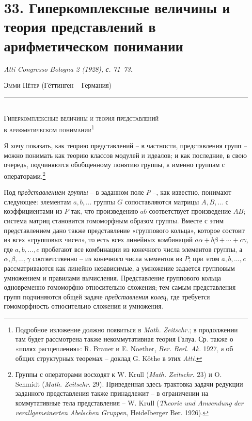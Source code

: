 \documentclass[11pt]{article}
\begin{document}
\section*{33. Гиперкомплексные величины и теория представлений в арифметическом понимании}
\emph{Atti Congresso Bologna 2 (1928), с. 71--73.}

\begin{center}
\textsc{Эмми Нётер} (Гёттинген -- Германия)\\[-0.1em]
\rule{3em}{0.4pt}\\[0.8em]
\textsc{Гиперкомплексные величины и теория представлений}\\
\textsc{в арифметическом понимании}\footnote{Подробное изложение должно появиться в \emph{Math. Zeitschr.}; в продолжении там будет рассмотрена также некоммутативная теория Галуа. Ср. также о «полях расщепления»: R. Brauer и E. Noether, \emph{Ber. Berl. Ak.} 1927, а об общих структурных теоремах -- доклад G. Köthe в этих \emph{Atti}.}
\end{center}

Я хочу показать, как теорию представлений -- в частности, представления групп -- можно понимать как теорию классов модулей и идеалов; и как последние, в свою очередь, подчиняются обобщенному понятию группы, а именно группам с операторами.\footnote{Группы с операторами восходят к W. Krull (\emph{Math. Zeitschr.} 23) и O. Schmidt (\emph{Math. Zeitschr.} 29). Приведенная здесь трактовка задачи редукции заданного представления также принадлежит -- в ограничении на коммутативные тела представления -- W. Krull (\emph{Theorie und Anwendung der verallgemeinerten Abelschen Gruppen}, Heidelberger Ber. 1926).}

Под \emph{представлением группы} -- в заданном поле $P$ --, как известно, понимают следующее: элементам $a,b,\ldots$ группы $G$ сопоставляются матрицы $A,B,\ldots$ с коэффициентами из $P$ так, что произведению $ab$ соответствует произведение $AB$; система матриц становится гомоморфным образом группы. Вместе с этим представлением дано также представление «группового кольца», которое состоит из всех «групповых чисел», то есть всех линейных комбинаций $a\alpha+b\beta+\cdots+c\gamma$, где $a,b,\ldots,c$ пробегают все комбинации из конечного числа элементов группы, а $\alpha,\beta,\ldots,\gamma$ соответственно -- из конечного числа элементов из $P$; при этом $a,b,\ldots,c$ рассматриваются как линейно независимые, а умножение задается групповым умножением и правилами вычисления. Представление группового кольца одновременно гомоморфно относительно сложения; тем самым представления групп подчиняются общей задаче \emph{представления колец}, где требуется гомоморфность относительно сложения и умножения.
\end{document}
